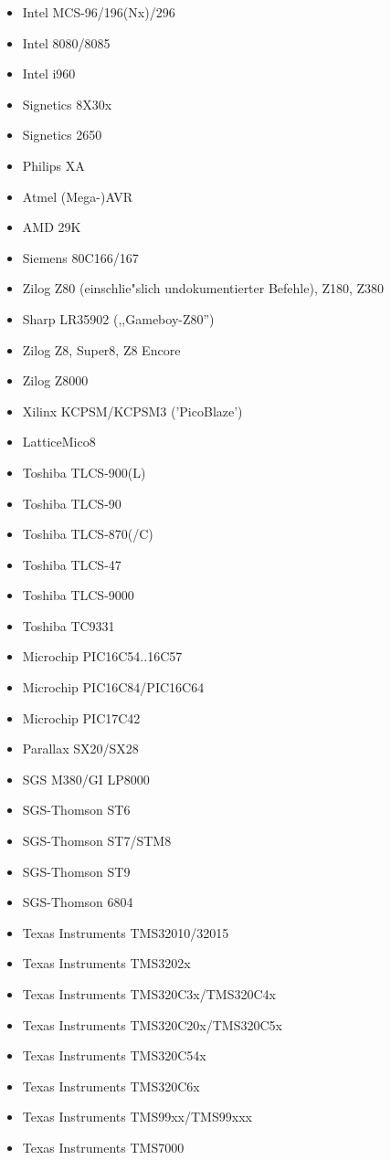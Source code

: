 \documentclass[12pt,a4paper,twoside]{report}
\begin{document}
\begin{itemize}
\item{Intel MCS-96/196(Nx)/296}
\item{Intel 8080/8085}
\item{Intel i960}
\item{Signetics 8X30x}
\item{Signetics 2650}
\item{Philips XA}
\item{Atmel (Mega-)AVR}
\item{AMD 29K}
\item{Siemens 80C166/167}
\item{Zilog Z80 (einschlie"slich undokumentierter Befehle), Z180, Z380}
\item{Sharp LR35902 (,,Gameboy-Z80'')}
\item{Zilog Z8, Super8, Z8 Encore}
\item{Zilog Z8000}
\item{Xilinx KCPSM/KCPSM3 ('PicoBlaze')}
\item{LatticeMico8}
\item{Toshiba TLCS-900(L)}
\item{Toshiba TLCS-90}
\item{Toshiba TLCS-870(/C)}
\item{Toshiba TLCS-47}
\item{Toshiba TLCS-9000}
\item{Toshiba TC9331}
\item{Microchip PIC16C54..16C57}
\item{Microchip PIC16C84/PIC16C64}
\item{Microchip PIC17C42}
\item{Parallax SX20/SX28}
\item{SGS M380/GI LP8000}
\item{SGS-Thomson ST6}
\item{SGS-Thomson ST7/STM8}
\item{SGS-Thomson ST9}
\item{SGS-Thomson 6804}
\item{Texas Instruments TMS32010/32015}
\item{Texas Instruments TMS3202x}
\item{Texas Instruments TMS320C3x/TMS320C4x}
\item{Texas Instruments TMS320C20x/TMS320C5x}
\item{Texas Instruments TMS320C54x}
\item{Texas Instruments TMS320C6x}
\item{Texas Instruments TMS99xx/TMS99xxx}
\item{Texas Instruments TMS7000}

\end{itemize}
\end{document}
